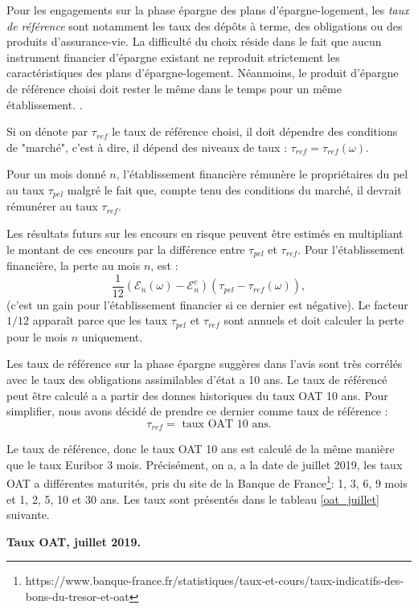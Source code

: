 \documentclass[12pt, a4paper]{book}
\newcommand{\E}{\mathcal{E}}
\begin{document}
Pour les engagements sur la phase épargne des plans d'épargne-logement, les {\it taux de référence} sont notamment les taux des dépôts à terme, des obligations ou des produits d'assurance-vie. La difficulté du choix réside dans le fait que aucun instrument financier d'épargne existant ne reproduit  strictement les caractéristiques des plans d'épargne-logement. Néanmoins, le produit d'épargne de référence choisi doit rester le même dans le temps pour un même établissement. \cite{CNC2}.

Si on dénote par $\tau_{ref}$ le taux de référence choisi, il doit dépendre des conditions de "marché", c'est à dire, il dépend des niveaux de taux : $\tau_{ref} = \tau_{ref}(\omega)$.

Pour un mois donné $n$, l'établissement financière rémunère le propriétaires du pel au taux $\tau_{pel}$ malgré le fait que, compte tenu des conditions du marché, il devrait rémunérer au taux $\tau_{ref}$. 

Les résultats futurs sur les encours en risque peuvent être estimés en multipliant le montant de
ces encours par la différence entre $\tau_{pel}$ et $\tau_{ref}$. Pour l'établissement financière, la perte au mois $n$, est :
$$\frac{1}{12}(\E_n(\omega) - \E_n^c)(\tau_{pel} - \tau_{ref}(\omega)),$$
(c'est un gain pour l'établissement financier si ce dernier est négative). Le facteur $1/12$  apparaît parce que les taux $\tau_{pel}$ et $\tau_{ref}$ sont annuels et doit calculer la perte pour le mois $n$ uniquement.

Les taux de référence sur la phase épargne suggères dans  l'avis \cite{CNC1} sont très corrélés avec le taux des obligations assimilables d'état a 10 ans. Le taux de référencé peut être calculé a a partir des donnes historiques du taux OAT 10 ans. Pour simplifier, nous avons  décidé de prendre ce dernier comme taux de référence :
$$ \tau_{ref} = \mbox{ taux OAT 10 ans}.$$

Le taux de référence, donc le taux OAT 10 ans est calculé de la même manière que le taux Euribor 3 mois. Précisément, on a, a la date de juillet 2019, les taux OAT a différentes maturités, pris du site de la Banque de France\footnote{https://www.banque-france.fr/statistiques/taux-et-cours/taux-indicatifs-des-bons-du-tresor-et-oat}: 1, 3, 6, 9 mois et 1, 2, 5, 10 et 30 ans. Les taux sont présentés dans le tableau \ref{oat_juillet} suivante.

\begin{table}[h!]
	\caption{\bf Taux OAT, juillet 2019.}
	\bigskip	
	\label{oat_juillet}
	\centering
\end{table}
\end{document}
